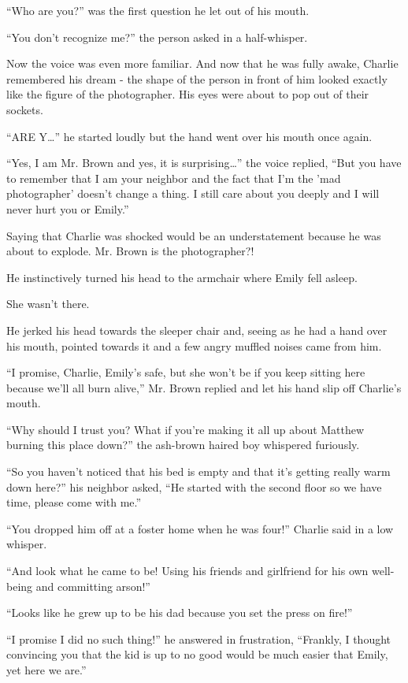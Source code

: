 “Who are you?” was the first question he let out of his mouth.

“You don't recognize me?” the person asked in a half-whisper.

Now the voice was even more familiar. And now that he was fully awake, Charlie remembered his dream - the shape of the person in front of him looked exactly like the figure of the photographer. His eyes were about to pop out of their sockets.

“ARE Y…” he started loudly but the hand went over his mouth once again.

“Yes, I am Mr. Brown and yes, it is surprising…” the voice replied, “But you have to remember that I am your neighbor and the fact that I'm the 'mad photographer' doesn't change a thing. I still care about you deeply and I will never hurt you or Emily.”

Saying that Charlie was shocked would be an understatement because he was about to explode. Mr. Brown is the photographer?!

He instinctively turned his head to the armchair where Emily fell asleep.

She wasn't there.

He jerked his head towards the sleeper chair and, seeing as he had a hand over his mouth, pointed towards it and a few angry muffled noises came from him.

“I promise, Charlie, Emily's safe, but she won't be if you keep sitting here because we'll all burn alive,” Mr. Brown replied and let his hand slip off Charlie's mouth.

“Why should I trust you? What if you're making it all up about Matthew burning this place down?” the ash-brown haired boy whispered furiously.

“So you haven't noticed that his bed is empty and that it's getting really warm down here?” his neighbor asked, “He started with the second floor so we have time, please come with me.”

“You dropped him off at a foster home when he was four!” Charlie said in a low whisper.

“And look what he came to be! Using his friends and girlfriend for his own well-being and committing arson!”

“Looks like he grew up to be his dad because you set the press on fire!”

“I promise I did no such thing!” he answered in frustration, “Frankly, I thought convincing you that the kid is up to no good would be much easier that Emily, yet here we are.”


